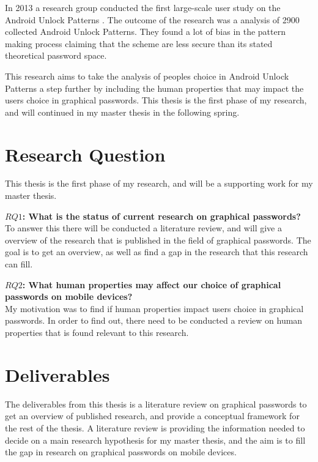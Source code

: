   In 2013 a research group conducted the first large-scale user study on the Android Unlock Patterns \cite{Uellenbeck}. The outcome of the research was a analysis of 2900 collected Android Unlock Patterns. They found a lot of bias in the pattern making process claiming that the scheme are less secure than its stated theoretical password space. 

  This research aims to take the analysis of peoples choice in Android Unlock Patterns a step further by including the human properties that may impact the users choice in graphical passwords. This thesis is the first phase of my research, and will continued in my master thesis in the following spring. 

  \section{Research Question}
    
    This thesis is the first phase of my research, and will be a supporting work for my master thesis. 

    {\bf $RQ1$: What is the status of current research on graphical passwords?} \\
    To answer this there will be conducted a literature review, and will give a overview of the research that is published in the field of graphical passwords. The goal is to get an overview, as well as find a gap in the research that this research can fill. 

    {\bf $RQ2$: What human properties may affect our choice of graphical passwords on mobile devices?}\\
    My motivation was to find if human properties impact users choice in graphical passwords. In order to find out, there need to be conducted a review on human properties that is found relevant to this research. 

  \section{Deliverables}

    The deliverables from this thesis is a literature review on graphical passwords to get an overview of published research, and provide a conceptual framework for the rest of the thesis. A literature review is providing the information needed to decide on a main research hypothesis for my master thesis, and the aim is to fill the gap in research on graphical passwords on mobile devices.

